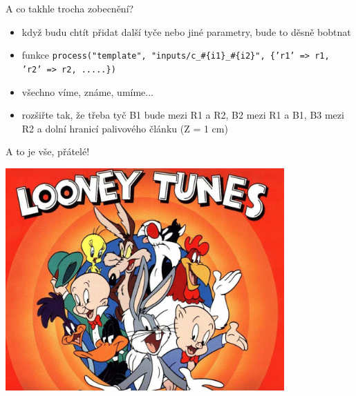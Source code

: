\documentclass{beamer}
\begin{document}
\begin{frame}{A co takhle trocha zobecnění?}
  \begin{itemize}
    \item když budu chtít přidat další tyče nebo jiné parametry, bude to děsně bobtnat
    \item funkce \texttt{process("template", "inputs/c\_\#\{i1\}\_\#\{i2\}", \{'r1' => r1, 'r2' => r2, .....\})}
    \item všechno víme, známe, umíme...
    \item rozšiřte tak, že třeba tyč B1 bude mezi R1 a R2, B2 mezi R1 a B1, B3 mezi R2 a dolní hranicí palivového článku (Z = 1 cm)
  \end{itemize}
\end{frame}

\begin{frame}{A to je vše, přátelé!}
  \begin{center}
    \includegraphics[width=0.8\textwidth]{looney_tunes}
  \end{center}
\end{frame}
\end{document}
